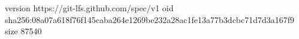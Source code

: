 version https://git-lfs.github.com/spec/v1
oid sha256:08a07a618f76f145caba264e1269be232a28ac1fe13a77b3dcbc71d7d3a167f9
size 87540
